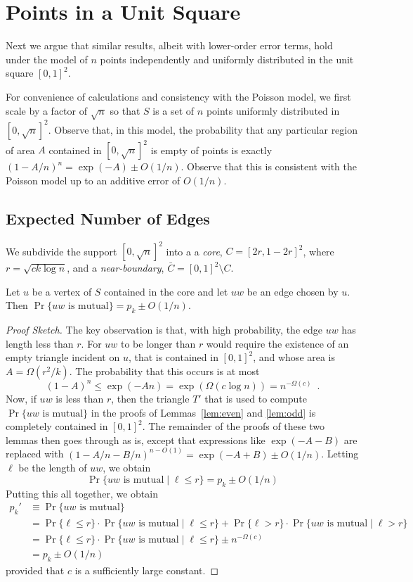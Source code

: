 \documentclass{patmorin}
\begin{document}
\section{Points in a Unit Square}

Next we argue that similar results, albeit with lower-order error terms,
hold under the model of $n$ points independently and uniformly distributed
in the unit square $[0,1]^2$.  

For convenience of calculations and consistency with the Poisson model,
we first scale by a factor of $\sqrt{n}$ so that $S$ is a set of $n$
points uniformly distributed in $[0,\sqrt{n}]^2$.  Observe that, in this
model, the probability that any particular region of area $A$ contained
in $[0,\sqrt{n}]^2$ is empty of points is exactly $(1-A/n)^n=\exp(-A)\pm
O(1/n)$.  Observe that this is consistent with the Poisson model up to 
an additive error of $O(1/n)$.

\subsection{Expected Number of Edges}

We subdivide the support $[0,\sqrt{n}]^2$ into a a \emph{core},
$C=[2r,1-2r]^2$, where $r=\sqrt{ck\log n}$, and a \emph{near-boundary},
$\bar{C}=[0,1]^2\setminus C$.

\begin{lem}
  Let $u$ be a vertex of $S$ contained in the core and let $uw$ be an edge
  chosen by $u$. Then $\Pr\{\mbox{$uw$ is mutual}\} = p_k\pm O(1/n)$.
\end{lem}

\begin{proof}[Proof Sketch]
The key observation is that, with high probability, the edge $uw$ has
length less than $r$.  For $uw$ to be longer than $r$  would require
the existence of an empty triangle incident on $u$, that is contained
in $[0,1]^2$, and whose area is $A=\Omega(r^2/k)$.  The probability that
this occurs is at most
\[
   (1-A)^n \le \exp(-An) = \exp(\Omega(c\log n)) = n^{-\Omega(c)} \enspace .
\]
Now, if $uw$ is less than $r$, then the triangle $T'$ that is
used to compute $\Pr\{\mbox{$uw$ is mutual}\}$ in the proofs of
Lemmas~\ref{lem:even} and \ref{lem:odd} is completely contained in
$[0,1]^2$.  The remainder of the proofs of these two lemmas then
goes through as is, except that expressions like
$\exp(-A-B)$ are replaced with $(1-A/n-B/n)^{n-O(1)}=\exp(-A+B)\pm O(1/n)$.
Letting $\ell$ be the length of $uw$, we obtain
\[
   \Pr\{\mbox{$uw$ is mutual}\mid \ell\le r\} = p_k\pm O(1/n)
\]
Putting this all together, we obtain
\begin{align*}
  p_k' & \equiv \Pr\{\mbox{$uw$ is mutual}\} \\
    & = \Pr\{\ell\le r\}\cdot\Pr\{\mbox{$uw$ is mutual}\mid \ell\le r\}
       + \Pr\{\ell> r\}\cdot\Pr\{\mbox{$uw$ is mutual}\mid \ell > r\} \\
    & =  \Pr\{\ell\le r\}\cdot\Pr\{\mbox{$uw$ is mutual}\mid \ell\le r\}
       \pm n^{-\Omega(c)} \\
    & =  p_k\pm O(1/n)
\end{align*}
provided that $c$ is a sufficiently large constant.
\end{proof}
\end{document}
